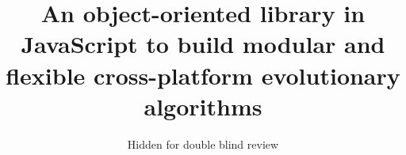 \documentclass[runningheads,a4paper]{llncs}
\begin{document}
\mainmatter  %

\title{An object-oriented library in JavaScript to build modular and flexible cross-platform evolutionary algorithms}

%
%

\author{Hidden for double blind review}
%
%



%


%
%

\maketitle
\end{document}
